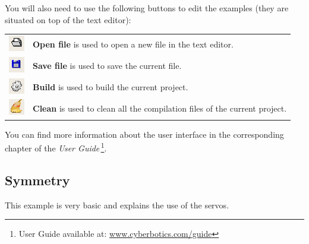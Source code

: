 \documentclass[a4paper, 12pt]{article}  		%
\begin{document}
You will also need to use the following buttons to edit the examples (they are situated on top of the text editor):
\begin{table}[H]
\begin{center}
\begin{tabular}{ c l }
\includegraphics{button_open.png} & \textbf{Open file} is used to open a new file in the text editor. \\
\includegraphics{button_save.png} & \textbf{Save file} is used to save the current file. \\
\includegraphics{button_compile.png} & \textbf{Build} is used to build the current project. \\
\includegraphics{button_clean.png} & \textbf{Clean} is used to clean all the compilation files of the current project. \\
\end{tabular}
\end{center}
\end{table}

You can find more information about the user interface in the corresponding chapter of the \textit{User Guide}\,\footnote{User Guide available at: \url{www.cyberbotics.com/guide}}.

\newpage
\subsection{Symmetry}

This example is very basic and explains the use of the servos.\\
\end{document}
